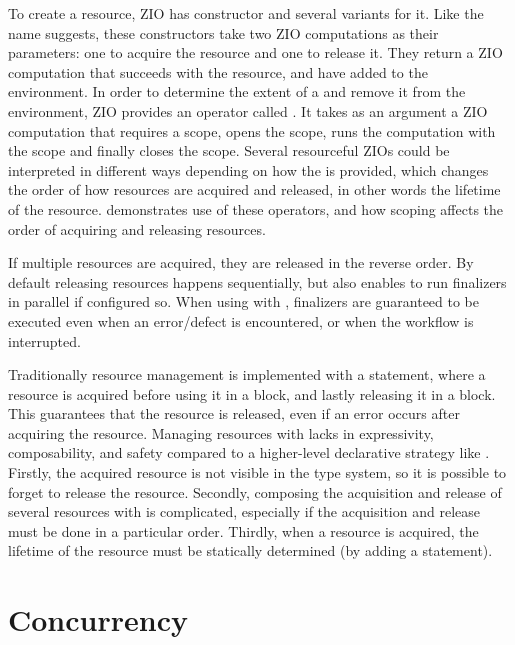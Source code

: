 To create a resource, ZIO has  constructor and several variants for it. Like the name suggests, these constructors take two ZIO computations as their parameters: one to acquire the resource and one to release it. They return a ZIO computation that succeeds with the resource, and have added  to the environment. In order to determine the extent of a  and remove it from the environment, ZIO provides an operator called . It takes as an argument a ZIO computation that requires a scope, opens the scope, runs the computation with the scope and finally closes the scope. Several resourceful ZIOs could be interpreted in different ways depending on how the  is provided, which changes the order of how resources are acquired and released, in other words the lifetime of the resource.  demonstrates use of these operators, and how scoping affects the order of acquiring and releasing resources.



If multiple resources are acquired, they are released in the reverse order. By default releasing resources happens sequentially, but  also enables to run finalizers in parallel if configured so. When using  with , finalizers are guaranteed to be executed even when an error/defect is encountered, or when the workflow is interrupted.

Traditionally resource management is implemented with a  statement, where a resource is acquired before using it in a  block, and lastly releasing it in a  block. This guarantees that the resource is released, even if an error occurs after acquiring the resource. Managing resources with  lacks in expressivity, composability, and safety compared to a higher-level declarative strategy like . Firstly, the acquired resource is not visible in the type system, so it is possible to forget to release the resource. Secondly, composing the acquisition and release of several resources with  is complicated, especially if the acquisition and release must be done in a particular order. Thirdly, when a resource is acquired, the lifetime of the resource must be statically determined (by adding a  statement).


\section{Concurrency}

